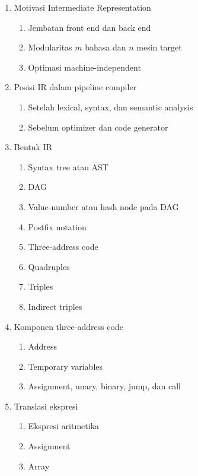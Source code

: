 \begin{enumerate}
    \item \pwajib Motivasi Intermediate Representation
    \begin{enumerate}
        \item \pwajib Jembatan front end dan back end
        \item \pwajib Modularitas $m$ bahasa dan $n$ mesin target
        \item \pwajib Optimasi machine-independent
    \end{enumerate}
    \item \pwajib Posisi IR dalam pipeline compiler
    \begin{enumerate}
        \item \pwajib Setelah lexical, syntax, dan semantic analysis
        \item \pwajib Sebelum optimizer dan code generator
    \end{enumerate}
    \item \pwajib Bentuk IR
    \begin{enumerate}
        \item \pwajib Syntax tree atau AST
        \item \pwajib DAG
        \item \ppaham Value-number atau hash node pada DAG
        \item \pwajib Postfix notation
        \item \pwajib Three-address code
        \item \pwajib Quadruples
        \item \pwajib Triples
        \item \ppaham Indirect triples
    \end{enumerate}
    \item \pwajib Komponen three-address code
    \begin{enumerate}
        \item \pwajib Address
        \item \pwajib Temporary variables
        \item \pwajib Assignment, unary, binary, jump, dan call
    \end{enumerate}
    \item \pwajib Translasi ekspresi
    \begin{enumerate}
        \item \pwajib Ekspresi aritmetika
        \item \pwajib Assignment
        \item \ppaham Array

\end{enumerate}
\end{enumerate}
